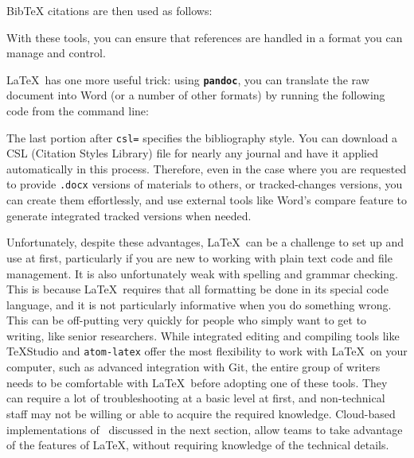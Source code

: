 
\noindent BibTeX citations are then used as follows:


With these tools, you can ensure that references are handled
in a format you can manage and control.\cite{flom2005latex}

\LaTeX\ has one more useful trick:
using \textbf{\texttt{pandoc}},
you can translate the raw document into Word
(or a number of other formats)
by running the following code from the command line:


\noindent The last portion after \texttt{csl=} specifies the bibliography style.
You can download a CSL (Citation Styles Library) file
for nearly any journal and have it applied automatically in this process.
Therefore, even in the case where you are requested to provide
\texttt{.docx} versions of materials to others, or tracked-changes versions,
you can create them effortlessly,
and use external tools like Word's compare feature
to generate integrated tracked versions when needed.

Unfortunately, despite these advantages, \LaTeX\ can be a challenge to set up and use at first,
particularly if you are new to working with plain text code and file management.
It is also unfortunately weak with spelling and grammar checking.
This is because \LaTeX\ requires that all formatting be done in its special code language,
and it is not particularly informative when you do something wrong.
This can be off-putting very quickly for people
who simply want to get to writing, like senior researchers.
While integrated editing and compiling tools like TeXStudio
and \texttt{atom-latex}
offer the most flexibility to work with \LaTeX\ on your computer,
such as advanced integration with Git,
the entire group of writers needs to be comfortable
with \LaTeX\ before adopting one of these tools.
They can require a lot of troubleshooting at a basic level at first,
and non-technical staff may not be willing or able to acquire the required knowledge.
Cloud-based implementations of \LaTex\, discussed in the next section,
allow teams to take advantage of the features of \LaTeX,
without requiring knowledge of the technical details.

